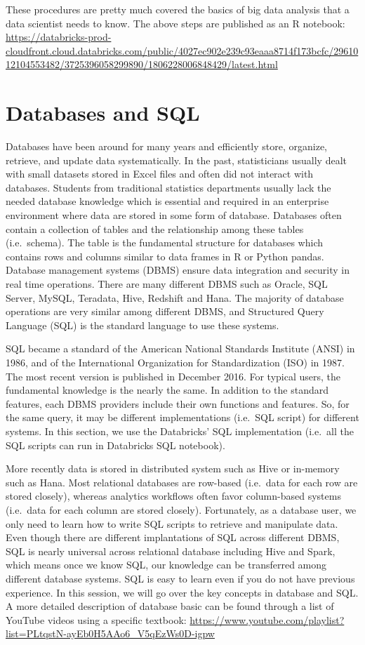 \documentclass[]{book}
\theoremstyle{definition}
\theoremstyle{definition}
\theoremstyle{remark}
\begin{document}
These procedures are pretty much covered the basics of big data analysis
that a data scientist needs to know. The above steps are published as an
R notebook:
\url{https://databricks-prod-cloudfront.cloud.databricks.com/public/4027ec902e239c93eaaa8714f173bcfc/2961012104553482/3725396058299890/1806228006848429/latest.html}

\section{Databases and SQL}\label{databases-and-sql}

Databases have been around for many years and efficiently store,
organize, retrieve, and update data systematically. In the past,
statisticians usually dealt with small datasets stored in Excel files
and often did not interact with databases. Students from traditional
statistics departments usually lack the needed database knowledge which
is essential and required in an enterprise environment where data are
stored in some form of database. Databases often contain a collection of
tables and the relationship among these tables (i.e.~schema). The table
is the fundamental structure for databases which contains rows and
columns similar to data frames in R or Python pandas. Database
management systems (DBMS) ensure data integration and security in real
time operations. There are many different DBMS such as Oracle, SQL
Server, MySQL, Teradata, Hive, Redshift and Hana. The majority of
database operations are very similar among different DBMS, and
Structured Query Language (SQL) is the standard language to use these
systems.

SQL became a standard of the American National Standards Institute
(ANSI) in 1986, and of the International Organization for
Standardization (ISO) in 1987. The most recent version is published in
December 2016. For typical users, the fundamental knowledge is the
nearly the same. In addition to the standard features, each DBMS
providers include their own functions and features. So, for the same
query, it may be different implementations (i.e.~SQL script) for
different systems. In this section, we use the Databricks' SQL
implementation (i.e.~all the SQL scripts can run in Databricks SQL
notebook).

More recently data is stored in distributed system such as Hive or
in-memory such as Hana. Most relational databases are row-based
(i.e.~data for each row are stored closely), whereas analytics workflows
often favor column-based systems (i.e.~data for each column are stored
closely). Fortunately, as a database user, we only need to learn how to
write SQL scripts to retrieve and manipulate data. Even though there are
different implantations of SQL across different DBMS, SQL is nearly
universal across relational database including Hive and Spark, which
means once we know SQL, our knowledge can be transferred among different
database systems. SQL is easy to learn even if you do not have previous
experience. In this session, we will go over the key concepts in
database and SQL. A more detailed description of database basic can be
found through a list of YouTube videos using a specific textbook:
\url{https://www.youtube.com/playlist?list=PLtqstN-ayEb0H5AAo6_V5qEzWs0D-igpw}
\end{document}
